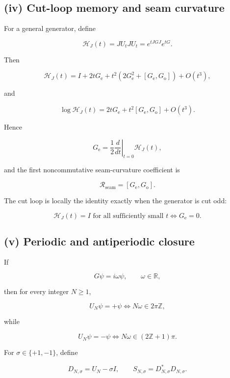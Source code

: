 \hypertarget{iv-cut-loop-memory-and-seam-curvature}{%
\subsection{(iv) Cut-loop memory and seam curvature}\label{iv-cut-loop-memory-and-seam-curvature}}

For a general generator, define

\[
\boxed{
\mathscr H_J(t)=JU_tJU_t=e^{tJGJ}e^{tG}.
}
\tag{3.14}
\]

Then

\[
\boxed{
\mathscr H_J(t)
=
I+2tG_{\mathrm e}
+t^2\left(2G_{\mathrm e}^2+[G_{\mathrm e},G_{\mathrm o}]\right)
+O(t^3),
}
\tag{3.15}
\]

and

\[
\boxed{
\log\mathscr H_J(t)
=
2tG_{\mathrm e}
+t^2[G_{\mathrm e},G_{\mathrm o}]
+O(t^3).
}
\tag{3.16}
\]

Hence

\[
\boxed{
G_{\mathrm e}
=
\frac12\left.\frac{d}{dt}\right|_{t=0}\mathscr H_J(t),
}
\tag{3.17}
\]

and the first noncommutative seam-curvature coefficient is

\[
\boxed{
\mathcal R_{\mathrm{seam}}
=[G_{\mathrm e},G_{\mathrm o}].
}
\tag{3.18}
\]

The cut loop is locally the identity exactly when the generator is cut odd:

\[
\boxed{
\mathscr H_J(t)=I
\text{ for all sufficiently small }t
\iff
G_{\mathrm e}=0.
}
\tag{3.19}
\]

\hypertarget{v-periodic-and-antiperiodic-closure}{%
\subsection{(v) Periodic and antiperiodic closure}\label{v-periodic-and-antiperiodic-closure}}

If

\[
G\psi=i\omega\psi,
\qquad \omega\in\mathbb R,
\]

then for every integer \(N\ge1\),

\[
U_N\psi=+\psi
\iff
N\omega\in2\pi\mathbb Z,
\tag{3.20}
\]

while

\[
U_N\psi=-\psi
\iff
N\omega\in(2\mathbb Z+1)\pi.
\tag{3.21}
\]

For \(\sigma\in\{+1,-1\}\), define

\[
D_{N,\sigma}=U_N-\sigma I,
\qquad
S_{N,\sigma}=D_{N,\sigma}^*D_{N,\sigma}.
\tag{3.22}
\]

